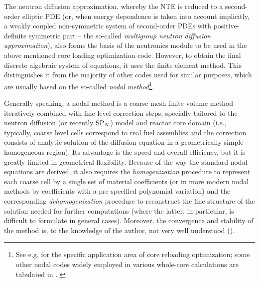 The neutron diffusion approximation, whereby the NTE is reduced to a second-order elliptic PDE (or, when energy
dependence is taken into account implicitly, a weakly coupled non-symmetric system of second-order PDEs with
positive-definite symmetric part -- the so-called \textit{multigroup neutron diffusion
approximation}), also forms the basis of the neutronics module to be used in the above
mentioned core loading optimization code. However, to obtain the final discrete algebraic system of equations, it uses the finite element method. This distinguishes it from the majority of 
other codes used for similar purposes, which are usually based on the so-called \textit{nodal method}\footnote{See e.g.
\cite{opt1,opt2,opt3} for the specific application area of core reloading optimization; some other nodal codes widely
employed in various whole-core calculations are tabulated in \cite{mox-bench}. \label{ftn:nodal}}.

Generally speaking, a nodal method is a coarse mesh finite volume method iteratively combined with
fine-level correction steps, specially tailored to the neutron diffusion (or recently $\text{SP}_{N}$) model and reactor core domain (i.e., typically, 
coarse level cells correspond to real fuel assemblies and the correction consists of analytic solution of the diffusion equation in a
geometrically simple homogeneous region). Its advantage is the speed and overall efficiency, but it is greatly limited
in geometrical flexibility. Because of the way the standard nodal equations are derived, it also requires the
\textit{homogenization} procedure to represent each coarse cell by a single set of material coefficients (or in more
modern nodal methods by coefficients with a pre-specified polynomial variation) and the corresponding
\textit{dehomogenization} procedure to reconstruct the fine structure of the solution needed for further computations
(where the latter, in particular, is difficult to formulate in general cases). Moreover, the convergence and stability
of the method is, to the knowledge of the author, not very well understood (\cite{ZiminComm}).

